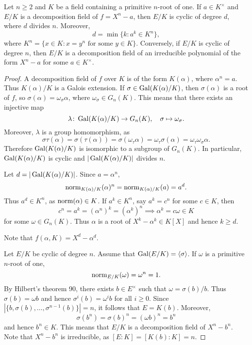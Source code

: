 \chapter{}

\begin{proposition}
    Let $n\geq2$ and $K$ be a field containing a primitive $n$-root of one. If 
    $a\in K^{\times}$ and 
    $E/K$ is a decomposition field of $f=X^n-a$, then $E/K$ is cyclic
    of degree $d$, where $d$ divides $n$. Moreover, 
    \[
    d=\min\{k:a^k\in K^n\},
    \]
    where $K^n=\{x\in K:x=y^n\text{ for some $y\in K$}\}$. 
    Conversely, 
    if $E/K$ is cyclic of degree $n$, then $E/K$ is a decomposition
    field of an irreducible polynomial 
    of the form $X^n-a$ for some $a\in K^{\times}$. 
\end{proposition}

\begin{proof}
    A decomposition field of $f$ over $K$ is
    of the form $K(\alpha)$, where $\alpha^n=a$. Thus 
    $K(\alpha)/K$ is a Galois extension. If $\sigma\in\operatorname{Gal}(K(\alpha)/K)$, 
    then $\sigma(\alpha)$ is a root of $f$, so 
    $\sigma(\alpha)=\omega_\sigma\alpha$, where
    $\omega_\sigma\in G_n(K)$. This means that 
    there exists an injective map
    \[
    \lambda\colon\operatorname{Gal}(K(\alpha)/K)\to G_n(K),
    \quad
    \sigma\mapsto\omega_{\sigma}.
    \]
    Moreover, $\lambda$ is a group homomorphism, as 
    \[
    \sigma\tau(\alpha)=\sigma(\tau(\alpha))=\sigma(\omega_{\tau}\alpha)=\omega_\tau\sigma(\alpha)=\omega_{\tau}\omega_{\sigma}\alpha.
    \]
    Therefore $\operatorname{Gal}(K(\alpha)/K)$ is isomorphic to a subgroup
    of $G_n(K)$. In particular, $\operatorname{Gal}(K(\alpha)/K)$ is cyclic
    and $|\operatorname{Gal}(K(\alpha)/K)|$ divides $n$.
    
    
    Let $d=|\operatorname{Gal}(K(\alpha)/K)|$. Since $a=\alpha^n$, 
    \[
    \operatorname{norm}_{K(\alpha)/K}(\alpha)^n=\operatorname{norm}_{K(\alpha)/K}(a)=a^d.
    \]
    Thus $a^d\in K^n$, as $\operatorname{norm}(\alpha)\in K$. If $a^k\in K^n$, 
    say $a^k=c^n$ for some $c\in K$, then 
    \[
    c^n=a^k=(\alpha^n)^k=(\alpha^k)^n
    \implies 
    \alpha^k=c\omega\in K
    \]
    for some $\omega\in G_n(K)$. Thus $\alpha$ is a root of $X^k-\alpha^k\in K[X]$
    and hence $k\geq d$. 
    
    Note that $f(\alpha,K)=X^d-\alpha^d$. 
    
    Let $E/K$ be cyclic of degree $n$. Assume that  
    $\operatorname{Gal}(E/K)=\langle\sigma\rangle$.
    If $\omega$ is a primitive
    $n$-root of one, 
    \[
    \operatorname{norm}_{E/K}(\omega)=\omega^n=1.
    \]
    By Hilbert's theorem 90, 
    there exists $b\in E^{\times}$ such that 
    $\omega=\sigma(b)/b$. Thus
    $\sigma(b)=\omega b$ and hence 
    $\sigma^i(b)=\omega^i b$ for all $i\geq0$. Since 
    $|\{b,\sigma(b),\dots,\sigma^{n-1}(b)\}|=n$, 
    it follows that $E=K(b)$. Moreover, 
    \[
    \sigma(b^n)=\sigma(b)^n=(\omega b)^n=b^n
    \]
    and hence $b^n\in K$. This means that $E/K$ is a decomposition
    field of $X^n-b^n$. Note that $X^n-b^n$ is irreducible, as 
    $[E:K]=[K(b):K]=n$. 
\end{proof}


